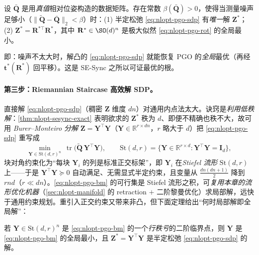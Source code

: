\begin{theorem}\label{thm:nlopt-sesync-exact}
设 $\bar{\mathbf{Q}}$ 是用\emph{真值}相对位姿构造的数据矩阵。存在常数 $\beta(\bar{\mathbf{Q}})>0$，使得当测量噪声足够小（$\|\tilde{\mathbf{Q}}-\bar{\mathbf{Q}}\|_2<\beta$）时：(1) 半定松弛 \cref{eq:nlopt-pgo-sdp} 有\emph{唯一}解 $\mathbf{Z}^*$；(2) $\mathbf{Z}^*=\mathbf{R}^{*\top}\mathbf{R}^*$，其中 $\mathbf{R}^*\in\SO(d)^n$ 是极大似然 \cref{eq:nlopt-pgo-rot} 的全局最小。
\end{theorem}

\noindent 即：噪声不太大时，解凸的 \cref{eq:nlopt-pgo-sdp} 就能恢复 PGO 的\emph{全局}最优（再经 $\mathbf{t}^*(\mathbf{R}^*)$ 回平移）。这是 SE-Sync 之所以可证最优的根。

\paragraph{第三步：Riemannian Staircase 高效解 SDP。}\cite{rosen2019sesync,carlone2026handbook}
直接解 \cref{eq:nlopt-pgo-sdp}（稠密 $\mathbf{Z}$ 维度 $dn$）对通用内点法太大。诀窍是\emph{利用低秩解}：\cref{thm:nlopt-sesync-exact} 表明欲求的 $\mathbf{Z}^*$ 秩为 $d$、即便不精确也秩不大，故可用 \emph{Burer--Monteiro 分解} $\mathbf{Z}=\mathbf{Y}^\top\mathbf{Y}$（$\mathbf{Y}\in\mathbb{R}^{r\times dn}$，$r$ 略大于 $d$）把 \cref{eq:nlopt-pgo-sdp} 重写成
\begin{equation}
  \min_{\mathbf{Y}\in\mathrm{St}(d,r)^n}\ \operatorname{tr}\!\big(\tilde{\mathbf{Q}}\,\mathbf{Y}^\top\mathbf{Y}\big),
  \qquad \mathrm{St}(d,r)=\{\mathbf{Y}\in\mathbb{R}^{r\times d}:\mathbf{Y}^\top\mathbf{Y}=\mathbf{I}_d\},
  \label{eq:nlopt-pgo-bm}
\end{equation}
块对角约束化为“每块 $\mathbf{Y}_i$ 的列是标准正交标架”，即 $\mathbf{Y}_i$ 在\emph{Stiefel 流形} $\mathrm{St}(d,r)$ 上——于是 $\mathbf{Y}^\top\mathbf{Y}\succeq0$ 自动满足、无需显式半定约束，且变量从 $\tfrac{dn(dn+1)}{2}$ 降到 $rnd$（$r\ll dn$）。\cref{eq:nlopt-pgo-bm} 的可行集是 Stiefel 流形之积，可\emph{复用本章的流形优化机器}（\cref{sec:nlopt-manifold} 的 retraction $+$ 二阶黎曼优化）求局部解，远快于通用约束规划。重引入正交约束又带来非凸，但下面定理给出“何时局部解即全局解”：

\begin{theorem}[全局最优的充分条件]\label{thm:nlopt-staircase}
若 $\mathbf{Y}\in\mathrm{St}(d,r)^n$ 是 \cref{eq:nlopt-pgo-bm} 的一个\emph{行秩亏}的二阶临界点，则 $\mathbf{Y}$ 是 \cref{eq:nlopt-pgo-bm} 的全局最小，且 $\mathbf{Z}^*=\mathbf{Y}^\top\mathbf{Y}$ 是半定松弛 \cref{eq:nlopt-pgo-sdp} 的解。
\end{theorem}

